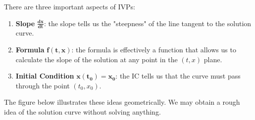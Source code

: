 \documentclass[09pt,letterpaper]{article}
\begin{document}
There are three important aspects of IVPs:
\begin{enumerate}
    \item \textbf{Slope} $\mathbf{\tfrac{dx}{dt}}$: the slope tells us the "steepness" of the line tangent to the solution curve.  
    \item \textbf{Formula} $\mathbf{f(t,x)}$: the formula is effectively a function that allows us to calculate the slope of the solution at any point in the $(t,x)$ plane.
    \item \textbf{Initial Condition} $\mathbf{x(t_0)=x_0}$: the IC tells us that the curve must pass through the point $(t_0, x_0)$. 
\end{enumerate}
The figure below illustrates these ideas geometrically. We may obtain a rough idea of the solution curve without solving anything.
\end{document}
